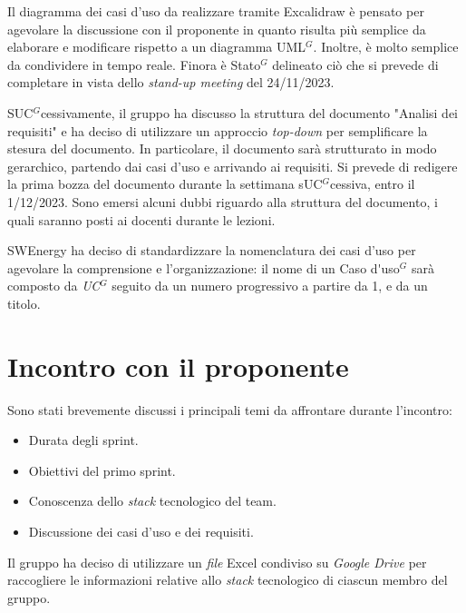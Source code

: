 Il diagramma dei casi d'uso da realizzare tramite Excalidraw è pensato per
agevolare la discussione con il proponente in quanto risulta più semplice da
elaborare e modificare rispetto a un diagramma \gls{UML}$^G$. Inoltre, è molto
semplice da condividere in tempo reale. Finora è \gls{Stato}$^G$ delineato ciò che si
prevede di completare in vista dello \textit{stand-up meeting} del 24/11/2023.

S\gls{UC}$^G$cessivamente, il gruppo ha discusso la struttura del documento "Analisi dei
requisiti" e ha deciso di utilizzare un approccio \textit{top-down} per
semplificare la stesura del documento. In particolare, il documento sarà
strutturato in modo gerarchico, partendo dai casi d'uso e arrivando ai
requisiti. Si prevede di redigere la prima bozza del documento durante la
settimana s\gls{UC}$^G$cessiva, entro il 1/12/2023.
Sono emersi alcuni dubbi riguardo alla struttura del documento, i quali saranno
posti ai docenti durante le lezioni.

SWEnergy ha deciso di standardizzare la nomenclatura dei casi d'uso per
agevolare la comprensione e l'organizzazione: il nome di un \gls{Caso d'uso}$^G$ sarà
composto da \textit{\gls{UC}$^G$} seguito da un numero progressivo a partire da 1, e da
un titolo.

\section{Incontro con il proponente}

Sono stati brevemente discussi i principali temi da affrontare durante
l'incontro:

\begin{itemize}
	\item Durata degli sprint.
	\item Obiettivi del primo sprint.
	\item Conoscenza dello \textit{stack} tecnologico del team.
	\item Discussione dei casi d'uso e dei requisiti.
\end{itemize}

Il gruppo ha deciso di utilizzare un \textit{file} Excel condiviso su
\textit{Google Drive} per raccogliere le informazioni relative allo
\textit{stack} tecnologico di ciascun membro del gruppo.

